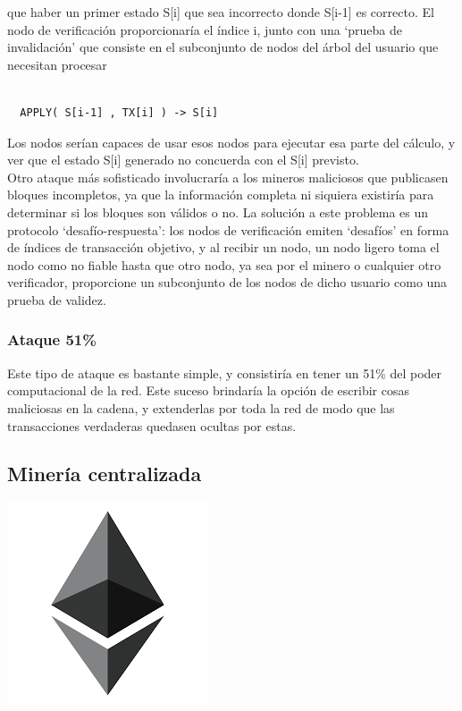 \documentclass[11pt,a4paper]{article}
\begin{document}
que haber un primer estado S[i] que sea incorrecto donde S[i-1] es correcto. El nodo de
verificación proporcionaría el índice i, junto con una ‘prueba de invalidación’ que consiste en el subconjunto de nodos del árbol del usuario que necesitan procesar
\begin{lstlisting}

  APPLY( S[i-1] , TX[i] ) -> S[i]

\end{lstlisting}

Los nodos serían capaces de usar esos nodos para ejecutar esa parte del cálculo, y ver que el estado S[i] generado no concuerda con el S[i] previsto.\\ 

Otro ataque más sofisticado involucraría a los mineros maliciosos que publicasen bloques
incompletos, ya que la información completa ni siquiera existiría para determinar si los bloques son válidos o no. La solución a este problema es un protocolo ‘desafío-respuesta’: los nodos de verificación emiten ‘desafíos’ en forma de índices de transacción objetivo, y al recibir un nodo, un nodo ligero toma el nodo como no fiable hasta que otro nodo, ya sea por el minero o cualquier otro verificador, proporcione un subconjunto de los nodos de dicho usuario como una prueba de validez.

\subsubsection{Ataque 51\%}

Este tipo de ataque es bastante simple, y consistiría en tener un 51\% del poder computacional de la red. Este suceso brindaría la opción de escribir cosas maliciosas en la cadena, y extenderlas por toda la red de modo que las transacciones verdaderas quedasen ocultas por estas.


\subsection{Minería centralizada}

\newpage
\begin{center}
  \includegraphics[scale=.42]{images/logo.png}
\end{center}

\tableofcontents
\end{document}
